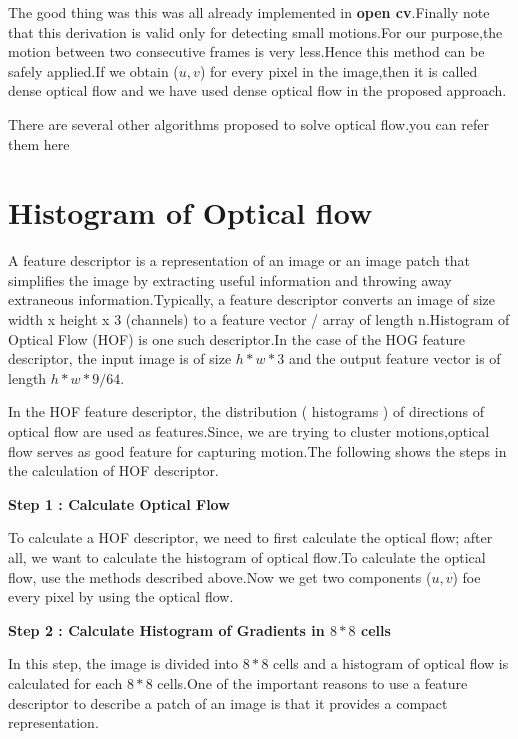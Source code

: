 The good thing was this was all already implemented in \textbf{open cv}.Finally note that this derivation is valid only for detecting small motions.For our purpose,the motion between two consecutive frames is very less.Hence this method can be safely applied.If we obtain ($u,v$) for every pixel in the image,then it is called dense optical flow and we have used dense optical flow in the proposed approach.

There are several other algorithms proposed to solve optical flow.you can refer them here\cite{Optical}


\section{Histogram of Optical flow}
A feature descriptor is a representation of an image or an image patch that simplifies the image by extracting useful information and throwing away extraneous information.Typically, a feature descriptor converts an image of size width x height x 3 (channels) to a feature vector / array of length n.Histogram of Optical Flow (HOF) is one such descriptor.In the case of the HOG feature descriptor, the input image is of size $h * w * 3$ and the output feature vector is of length $ h * w * 9 / 64 $.

In the HOF feature descriptor, the distribution ( histograms ) of directions of optical flow are used as features.Since, we are trying to cluster motions,optical flow serves as good feature for capturing motion.The following shows the steps in the calculation of HOF descriptor.

\textbf{Step 1 : Calculate Optical Flow}

To calculate a HOF descriptor, we need to first calculate the optical flow; after all, we want to calculate the histogram of optical flow.To calculate the optical flow, use the methods described above.Now we get two components ($u,v$) foe every pixel by using the optical flow.

\textbf{Step 2 : Calculate Histogram of Gradients in \begin{math}8*8\end{math} cells}

In this step, the image is divided into \begin{math}8*8\end{math} cells and a histogram of optical flow is calculated for each \begin{math}8*8\end{math} cells.One of the important reasons to use a feature descriptor to describe a patch of an image is that it provides a compact representation.

